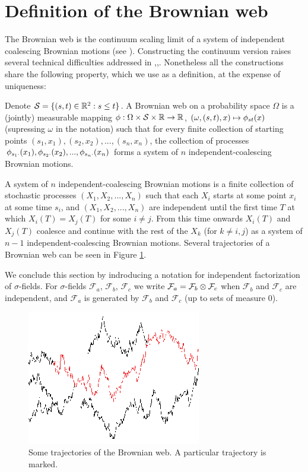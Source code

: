 {
\section{Definition of the Brownian web}
\label{sec:brownian-web-definition}

The Brownian web is the continuum scaling limit of a system of
independent coalescing Brownian motions (see
\cite{tsirelson-lecture-course}).  Constructing the
continuum version raises several technical difficulties addressed in
\cite{toth-werner},\cite{fontes-et-al},\cite{norris-turner-convergence-to-bw}.
Nonetheless all the
constructions share the following property, which we use as a
definition, at the expense of uniqueness:

  Denote $\mathcal{S}=\{(s, t) \in \mathbb{R}^2 : s \le t\}$.
  A Brownian web on a probability space $\Omega$ is a (jointly)
  measurable mapping $\phi : \Omega \times \mathcal{S} \times \mathbb{R}
  \to \mathbb{R}$, $(\omega, (s, t), x) \mapsto \phi_{{s}{t}}(x)$ (supressing
  $\omega$ in the notation) such that for every finite collection of
  starting points $(s_1, x_1),(s_2, x_2),...,(s_n, x_n)$, the
  collection of processes $\phi_{{s_1}{\cdot}}(x_1),
  \phi_{{s_2}{\cdot}}(x_2),...,\phi_{{s_n}{\cdot}}(x_n)$
  forms a system of $n$ independent-coalescing Brownian motions.

  A system of $n$ independent-coalescing Brownian motions is a finite
  collection of stochastic processes $(X_1, X_2,...,X_n)$ such that
  each $X_i$ starts at some point $x_i$ at some time $s_i$, and $(X_1,
  X_2,...,X_n)$ are independent until the first time $T$ at which
  $X_i(T)=X_j(T)$ for some $i\neq j$. From this time onwards $X_i(T)$
  and $X_j(T)$ coalesce and continue with the rest of the $X_k$ (for
  $k\neq i,j$) as a system of $n-1$ independent-coalescing Brownian motions.
  Several trajectories of a Brownian web can be seen in Figure
  \ref{fig:bw-trajectories}.

  \newcommand{\F}{\mathcal{F}}
We conclude this section by indroducing a notation for independent
factorization of $\sigma$-fields.
  For $\sigma$-fields $\F_a$, $\F_b$, $\F_c$ we write $\F_a = \F_b
  \tensor \F_c$ when $\F_b$ and $\F_c$ are independent, and $\F_a$
  is generated by $\F_b$ and $\F_c$ (up to sets of measure $0$).

\begin{figure}
   \centering
   \includegraphics[scale=2]{sometraj.eps}
   \caption{Some trajectories of the Brownian web. A particular trajectory is marked.}
  \label{fig:bw-trajectories}
\end{figure}
}
